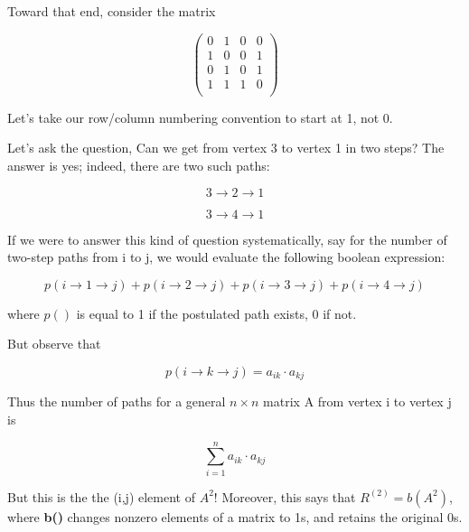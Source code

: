 Toward that end, consider the matrix

\begin{equation}
\left (
\begin{array}{rrrr}
0 & 1 & 0 & 0 \\
1 & 0 & 0 & 1 \\
0 & 1 & 0 & 1 \\
1 & 1 & 1 & 0 \\
\end{array}
\right )
\end{equation}

Let's take our row/column numbering convention to start at 1, not 0.

Let's ask the question, Can we get from vertex 3 to vertex 1 in two
steps?  The answer is yes; indeed, there are two such paths:

\begin{equation}
3 \rightarrow 2 \rightarrow 1
\end{equation}

\begin{equation}
3 \rightarrow 4 \rightarrow 1
\end{equation}

If we were to answer this kind of question systematically, say for the
number of two-step paths from i to j, we would evaluate the following
boolean expression:

\begin{equation}
p(i \rightarrow 1 \rightarrow j) +
p(i \rightarrow 2 \rightarrow j) +
p(i \rightarrow 3 \rightarrow j) +
p(i \rightarrow 4 \rightarrow j) 
\end{equation}

where $p()$ is equal to 1 if the postulated path exists, 0 if not.

But observe that

\begin{equation}
p(i \rightarrow k \rightarrow j) = a_{ik} \cdot a_{kj}
\end{equation}

Thus the number of paths for a general $n \times n$ matrix A from vertex
i to vertex j is

\begin{equation}
\sum_{i=1}^n a_{ik} \cdot a_{kj}
\end{equation}

But this is the the (i,j) element of $A^2$!  Moreover, this says that
$R^{(2)} = b(A^2)$, where {\bf b()} changes nonzero elements of a matrix
to 1s, and retains the original 0s.

